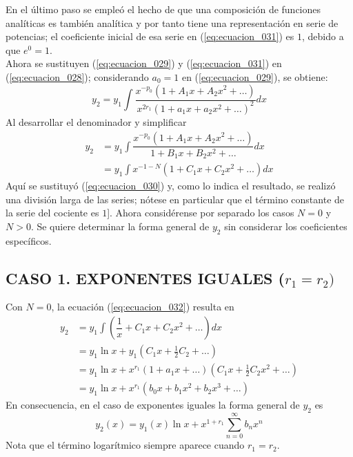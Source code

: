 En el último paso se empleó el hecho de que una composición de funciones analíticas es también analítica y por tanto tiene una representación en serie de potencias; el coeficiente inicial de esa serie en (\ref{eq:ecuacion_031}) es $1$, debido a que $e^{0} = 1$.
\\
Ahora se sustituyen (\ref{eq:ecuacion_029}) y (\ref{eq:ecuacion_031}) en (\ref{eq:ecuacion_028}); considerando $a_{0} = 1$ en (\ref{eq:ecuacion_029}), se obtiene:
\[ y_{2} = y_{1} \int \dfrac{x^{-p_{0}} (1 + A_{1} x + A_{2} x^{2} + \ldots )}{x^{2r_{1}} (1 + a_{1} x + a_{2} x^{2} + \ldots )^{2}} dx \]
Al desarrollar el denominador y simplificar
\begin{eqnarray}
y_{2} &= y_{1} \int \dfrac{x^{-p_{0}} (1 + A_{1} x + A_{2} x^{2} + \ldots )}{ 1 + B_{1} x + B_{2} x^{2} + \ldots } dx \nonumber \\
&= y_{1} \int x^{-1-N} (1 + C_{1} x + C_{2} x^{2} + \ldots ) dx
\label{eq:ecuacion_032}
\end{eqnarray}
Aquí se sustituyó (\ref{eq:ecuacion_030}) y, como lo indica el resultado, se realizó una división larga de las series; nótese en particular que el término constante de la serie del cociente es $1$]. Ahora considérense por separado los casos $N = 0$ y $N > 0$. Se quiere determinar la forma general de $y_{2}$ sin considerar los coeficientes específicos.
\subsection*{CASO 1. EXPONENTES IGUALES ($r_{1} = r_{2})$}
Con $N = 0$, la ecuación (\ref{eq:ecuacion_032}) resulta en
\[  \begin{split}
y_{2} &= y_{1} \int \left( \dfrac{1}{x} + C_{1} x + C_{2} x^{2} + \ldots \right) dx \\
&= y_{1} \ln x + y_{1} (C_{1} x + \frac{1}{2} C_{2} + \ldots ) \\
&= y_{1} \ln x + x^{r_{1}} (1 +  a_{1} x + \ldots)(C_{1} x + \frac{1}{2} C_{2} x^{2} + \ldots ) \\
&= y_{1} \ln x + x^{r_{1}} (b_{0} x + b_{1} x^{2} + b_{2} x^{3} + \ldots )
\end{split} \]
En consecuencia, en el caso de exponentes iguales la forma general de $y_{2}$ es
\begin{equation}
y_{2}(x) = y_{1} (x) \ln x +  x^{1 + r_{1}} \sum_{n=0}^{\infty} b_{n} x^{n}
\label{eq:ecuacion_033}
\end{equation}
Nota que el término logarítmico siempre aparece cuando $r_{1} = r_{2}$.
